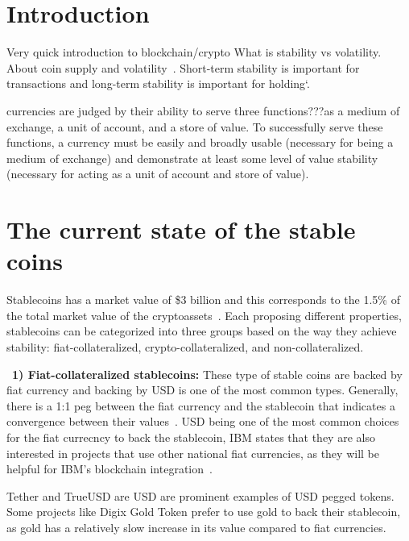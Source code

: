 \section{Introduction}
Very quick introduction to blockchain/crypto
What is stability vs volatility.
About coin supply and volatility~\cite{sams2015note}.
Short-term stability is important for transactions and long-term stability is important for holding`\cite{forbes}.


currencies are judged by their ability to serve three functions???as a medium of exchange, a unit of account, and a store of value. To successfully serve these functions, a currency must be easily and broadly usable (necessary for being a medium of exchange) and demonstrate at least some level of value stability (necessary for acting as a unit of account and store of value).


\section{The current state of the stable coins} %

Stablecoins has a market value of \$3 billion and this corresponds to the 1.5\% of the total market value of the cryptoassets~\cite{report}. Each proposing different properties, stablecoins can be categorized into three groups based on the way they achieve stability: fiat-collateralized, crypto-collateralized, and non-collateralized.

~\textbf{1) Fiat-collateralized stablecoins:} These type of stable coins are backed by fiat currency and backing by USD is one of the most common types. Generally, there is a 1:1 peg between the fiat currency and the stablecoin that indicates a convergence between their values~\cite{linkedin}. USD being one of the most common choices for the fiat currecncy to back the stablecoin, IBM states that they are also interested in projects that use other national fiat currencies, as they will be helpful for IBM's blockchain integration~\cite{cointelegraph}.


Tether and TrueUSD are USD are prominent examples of USD pegged tokens. Some projects like Digix Gold Token prefer to use gold to back their stablecoin, as gold has a relatively slow increase in its value compared to fiat currencies. %

